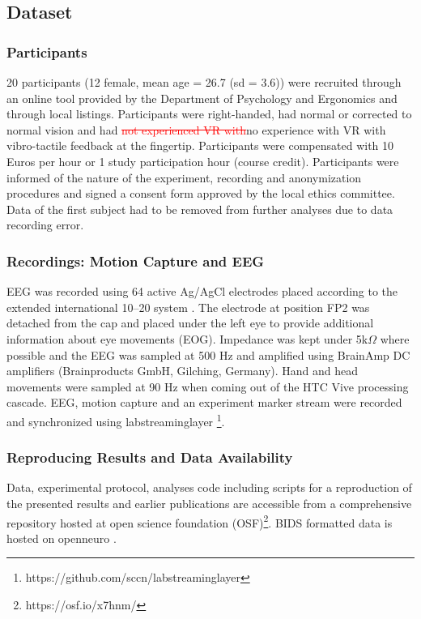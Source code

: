 
\subsection{Dataset}

\subsubsection{Participants}
20 participants (12 female, mean age = 26.7 (sd = 3.6)) were recruited through an online tool provided by the Department of Psychology and Ergonomics and through local listings. Participants were right-handed, had normal or corrected to normal vision and had \textcolor{red}{\st{not experienced VR with}}\textcolor{n}{no experience with VR with} vibro-tactile feedback at the fingertip. Participants were compensated with 10 Euros per hour or 1 study participation hour (course credit). Participants were informed of the nature of the experiment, recording and anonymization procedures and signed a consent form approved by the local ethics committee.
Data of the first subject had to be removed from further analyses due to data recording error.

\subsubsection{Recordings: Motion Capture and EEG}
EEG was recorded using 64 active Ag/AgCl electrodes placed according to the extended international 10–20 system \cite{Chatrian1985-ys}. The electrode at position FP2 was detached from the cap and placed under the left eye to provide additional information about eye movements (EOG). Impedance was kept under 5k$\Omega$ where possible and the EEG was sampled at 500 Hz and amplified using BrainAmp DC amplifiers (Brainproducts GmbH, Gilching, Germany). Hand and head movements were sampled at 90 Hz when coming out of the HTC Vive processing cascade. EEG, motion capture and an experiment marker stream were recorded and synchronized using labstreaminglayer \footnote{https://github.com/sccn/labstreaminglayer}.

\subsubsection{Reproducing Results and Data Availability}
Data, experimental protocol, analyses code including scripts for a reproduction of the presented results and earlier publications are accessible from a comprehensive repository hosted at open science foundation (OSF)\footnote{https://osf.io/x7hnm/}. BIDS formatted data is hosted on openneuro \cite{ds003846:1.0.0}.

